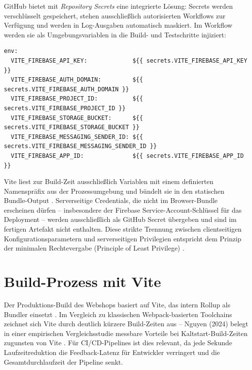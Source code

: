 GitHub bietet mit \textit{Repository Secrets} eine integrierte Lösung: Secrets werden verschlüsselt gespeichert, stehen ausschließlich autorisierten Workflows zur Verfügung und werden in Log-Ausgaben automatisch maskiert. Im Workflow werden sie als Umgebungsvariablen in die Build- und Testschritte injiziert:

\begin{lstlisting}[language={}, basicstyle=\ttfamily\scriptsize, caption=Secrets-Injektion als Umgebungsvariablen im Workflow, label=lst:secrets]
env:
  VITE_FIREBASE_API_KEY:             ${{ secrets.VITE_FIREBASE_API_KEY }}
  VITE_FIREBASE_AUTH_DOMAIN:         ${{ secrets.VITE_FIREBASE_AUTH_DOMAIN }}
  VITE_FIREBASE_PROJECT_ID:          ${{ secrets.VITE_FIREBASE_PROJECT_ID }}
  VITE_FIREBASE_STORAGE_BUCKET:      ${{ secrets.VITE_FIREBASE_STORAGE_BUCKET }}
  VITE_FIREBASE_MESSAGING_SENDER_ID: ${{ secrets.VITE_FIREBASE_MESSAGING_SENDER_ID }}
  VITE_FIREBASE_APP_ID:              ${{ secrets.VITE_FIREBASE_APP_ID }}
\end{lstlisting}

Vite liest zur Build-Zeit ausschließlich Variablen mit einem definierten Namenspräfix aus der Prozessumgebung und bündelt sie in den statischen Bundle-Output \cite{vite2025}. Serverseitige Credentials, die nicht im Browser-Bundle erscheinen dürfen -- insbesondere der Firebase Service-Account-Schlüssel für das Deployment -- werden ausschließlich als GitHub Secret übergeben und sind im fertigen Artefakt nicht enthalten. Diese strikte Trennung zwischen clientseitigen Konfigurationsparametern und serverseitigen Privilegien entspricht dem Prinzip der minimalen Rechtevergabe (Principle of Least Privilege) \cite{fredj2020}.

\section{Build-Prozess mit Vite}
\label{sec:vite-build}

Der Produktions-Build des Webshops basiert auf Vite, das intern Rollup als Bundler einsetzt \cite{vite2025}. Im Vergleich zu klassischen Webpack-basierten Toolchains zeichnet sich Vite durch deutlich kürzere Build-Zeiten aus -- Nguyen (2024) belegt in einer empirischen Vergleichsstudie messbare Vorteile bei Kaltstart-Build-Zeiten zugunsten von Vite \cite{nguyen2024vite}. Für CI/CD-Pipelines ist dies relevant, da jede Sekunde Laufzeitreduktion die Feedback-Latenz für Entwickler verringert und die Gesamtdurchlaufzeit der Pipeline senkt.

